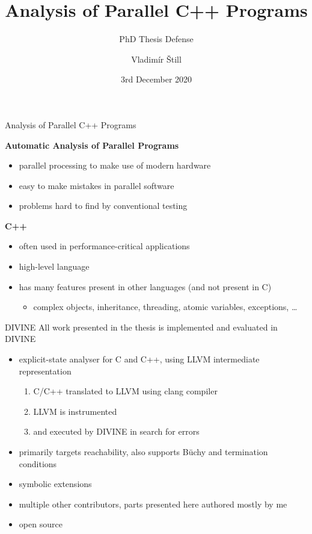 \documentclass[aspectratio=169, fi]{paradise-slide}
\title{Analysis of Parallel C++ Programs}
\subtitle{PhD Thesis Defense}
\author{Vladimír Štill}
\date{3rd December 2020}
\begin{document}

\begin{frame}{Analysis of Parallel C++ Programs}

\textbf{Automatic Analysis of Parallel Programs}
\begin{itemize}
    \item parallel processing to make use of modern hardware
    \item easy to make mistakes in parallel software
    \item problems hard to find by conventional testing
\end{itemize}
\pause

\bigskip
\textbf{C++}
\begin{itemize}
  \item often used in performance-critical applications
  \item high-level language
  \item has many features present in other languages (and not present in C)
    \pause
    \begin{itemize}
      \item complex objects, inheritance, threading, atomic variables, exceptions, …
    \end{itemize}
\end{itemize}
\end{frame}

\begin{frame}{DIVINE}
  All work presented in the thesis is implemented and evaluated in DIVINE

  \begin{itemize}
    \item explicit-state analyser for C and C++, using LLVM intermediate representation
      \begin{enumerate}
        \item C/C++ translated to LLVM using clang compiler
        \item LLVM is instrumented
        \item and executed by DIVINE in search for errors
      \end{enumerate}\pause
    \item primarily targets reachability, also supports Büchy and termination conditions
    \item symbolic extensions \pause
    \item multiple other contributors, parts presented here authored mostly by me
    \item open source
  \end{itemize}
\end{frame}
\end{document}
